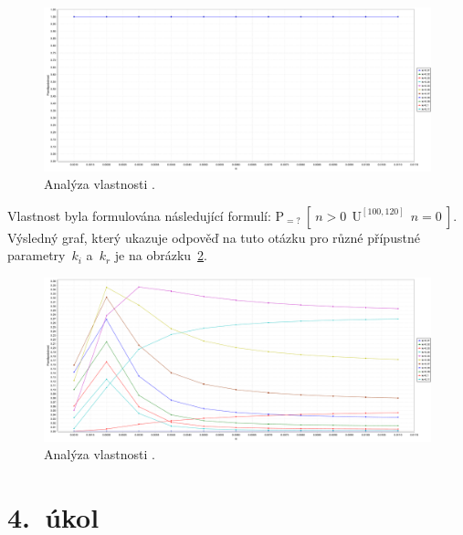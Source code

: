 \documentclass[a4paper, 11pt]{scrartcl}
\begin{document}
    \begin{figure}[ht]
        \centering
        \includegraphics[width=1 \linewidth]{img/prop1.pdf}
        \caption{%
            Analýza vlastnosti .
        }
        \label{fig:prop1}
    \end{figure}

    Vlastnost  byla formulována následující
    formulí: $ \mathrm{P}_{=?}\ [\ n > 0\ \ \mathrm{U}^{[100, 120]}\ \ n = 0
    \ ] $. Výsledný graf, který ukazuje odpověď na tuto otázku pro různé
    přípustné parametry~$ k_i $ a~$ k_r $ je na obrázku~\ref{fig:prop2}.

    \begin{figure}[ht]
        \centering
        \includegraphics[width=1 \linewidth]{img/prop2.pdf}
        \caption{%
            Analýza vlastnosti .
        }
        \label{fig:prop2}
    \end{figure}


    \section*{4.~úkol}
\end{document}
